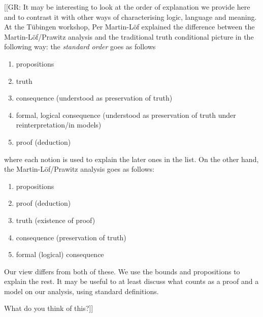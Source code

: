 \documentclass{article}
\begin{document}
[[GR: It may be interesting to look at the order of explanation we provide here and to contrast it with other ways of characterising logic, language and meaning. At the T\"ubingen workshop, Per Martin-L\"of explained the difference between the Martin-L\"of/Prawitz analysis and the traditional truth conditional picture in the following way: the \emph{standard order} goes as follows
\begin{enumerate}
\item propositions
\item truth
\item consequence (understood as preservation of truth)
\item formal, logical consequence (understood as preservation of truth under reinterpretation/in models)
\item proof (deduction)
\end{enumerate}
where each notion is used to explain the later ones in the list.
On the other hand, the Martin-L\"of/Prawitz analysis goes as follows:
\begin{enumerate}
\item propositions
\item proof (deduction)
\item truth (existence of proof)
\item consequence (preservation of truth)
\item formal (logical) consequence
\end{enumerate}
Our view differs from both of these. We use the bounds and propositions to explain the rest.  It may be useful to at least discuss what counts as a proof and a model on our analysis, using standard definitions.

What do you think of this?]]



\end{document}
